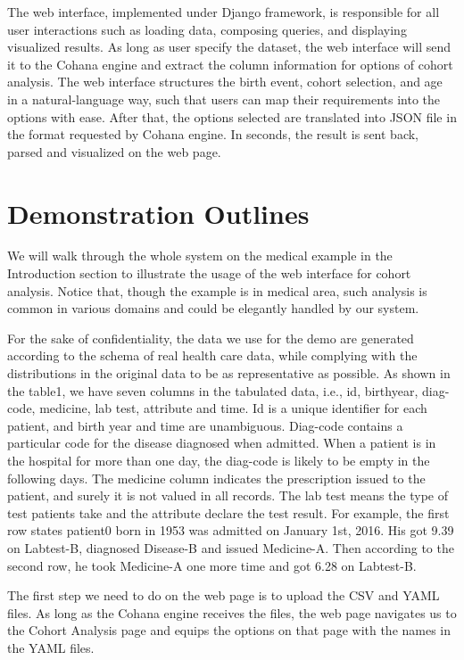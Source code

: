 \documentclass[10pt,conference,letterpaper]{IEEEtran}
\begin{document}
The web interface, implemented under Django framework, is responsible for all user interactions such as loading data, composing queries, and displaying visualized results. As long as user specify the dataset, the web interface will send it to the Cohana engine and extract the column information for options of cohort analysis. The web interface structures the birth event, cohort selection, and age in a natural-language way, such that users can map their requirements into the options with ease. After that, the options selected are translated into JSON file in the format requested by Cohana engine. In seconds, the result is sent back, parsed and visualized on the web page.

\section{Demonstration Outlines}

We will walk through the whole system on the medical example in the Introduction section to illustrate the usage of the web interface for cohort analysis. Notice that, though the example is in medical area, such analysis is common in various domains and could be elegantly handled by our system.

For the sake of confidentiality, the data we use for the demo are generated according to the schema of real health care data, while complying with the distributions in the original data to be as representative as possible. As shown in the table1, we have seven columns in the tabulated data, i.e., id, birthyear, diag-code, medicine, lab test, attribute and time. Id is a unique identifier for each patient, and birth year and time are unambiguous. Diag-code contains a particular code for the disease diagnosed when admitted. When a patient is in the hospital for more than one day, the diag-code is likely to be empty in the following days. The medicine column indicates the prescription issued to the patient, and surely it is not valued in all records. The lab test means the type of test patients take and the attribute declare the test result. For example, the first row states patient0 born in 1953 was admitted on January 1st, 2016. His got 9.39 on Labtest-B, diagnosed Disease-B and issued Medicine-A. Then according to the second row, he took Medicine-A one more time and got 6.28 on Labtest-B.

The first step we need to do on the web page is to upload the CSV and YAML files. As long as the Cohana engine receives the files, the web page navigates us to the Cohort Analysis page and equips the options on that page with the names in the YAML files.
\end{document}
